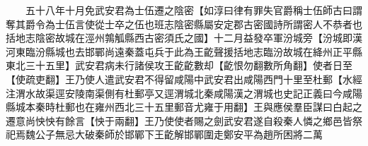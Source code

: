 　　五十八年十月免武安君為士伍遷之陰密【如淳曰律有罪失官爵稱士伍師古曰謂奪其爵令為士伍言使從士卒之伍也班志陰密縣屬安定郡古密國詩所謂密人不恭者也括地志陰密故城在涇州鶉觚縣西古密須氏之國】十二月益發卒軍汾城旁【汾城即漢河東臨汾縣城也去邯鄲尚遠秦蓋屯兵于此為王齕聲援括地志臨汾故城在絳州正平縣東北三十五里】武安君病未行諸侯攻王齕齕數却【齕恨勿翻數所角翻】使者日至【使疏吏翻】王乃使人遣武安君不得留咸陽中武安君出咸陽西門十里至杜郵【水經注渭水故渠逕安陵南渠側有杜郵亭又逕渭城北秦咸陽漢之渭城也史記正義曰今咸陽縣城本秦時杜郵也在雍州西北三十五里郵音尤雍于用翻】王與應侯羣臣謀曰白起之遷意尚怏怏有餘言【怏于兩翻】王乃使使者賜之劍武安君遂自殺秦人憐之鄉邑皆祭祀焉魏公子無忌大破秦師於邯鄲下王齕解邯鄲圍走鄭安平為趙所困將二萬